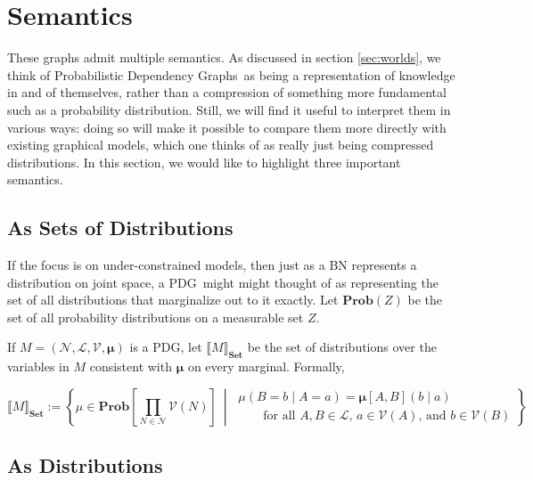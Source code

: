 \documentclass{article}
\newcommand{\modelnames}{Probabilistic Dependency Graphs}
\newcommand{\MN}{PDG}
\newcommand\Set{\textbf{Set}}
\begin{document}
	\section{Semantics}\label{sec:semantics}
	These graphs admit multiple semantics. As discussed in section \ref{sec:worlds}, we think of \modelnames\ as being a representation of knowledge in and of themselves, rather than a compression of something more fundamental such as a probability distribution. Still, we will find it useful to interpret them in various ways: doing so will make it possible to compare them more directly with existing graphical models, which one thinks of as really just being compressed distributions. In this section, we would like to highlight three important semantics.
	
	\subsection{As Sets of Distributions}\label{sec:set-of-distribution-semantics}
	If the focus is on under-constrained models, then just as a BN represents a distribution on joint space, a \MN\ might might thought of as representing the set of all distributions that marginalize out to it exactly. Let $\mathbf{Prob}(Z)$ be the set of all probability distributions on a measurable set $Z$. 
	
	\begin{defn}
		If $M = (\mathcal N, \mathcal L, \mathcal V, \boldsymbol\mu)$ is a \MN, let $\llbracket M \rrbracket_\Set$ be the set of distributions over the variables in $M$ consistent with $\boldsymbol\mu$ on every marginal. Formally,
		
		\[ \Big\llbracket M \Big\rrbracket_\Set := \left\{\mu \in \mathbf{Prob}\left[\prod_{N \in \mathcal N}\mathcal V(N)\right] ~\middle|~
		\begin{array}{l}
		\mu(B = b \mid A = a) = \boldsymbol\mu[A,B](b \mid a) \\[0.2em]
		\qquad\text{for all $A, B \in \mathcal L$, $a \in\mathcal V(A)$, and $b \in \mathcal V(B)$} \end{array} \right\}\]
	\end{defn}
	

		
	
	

	\subsection{As Distributions}
	
\end{document}

